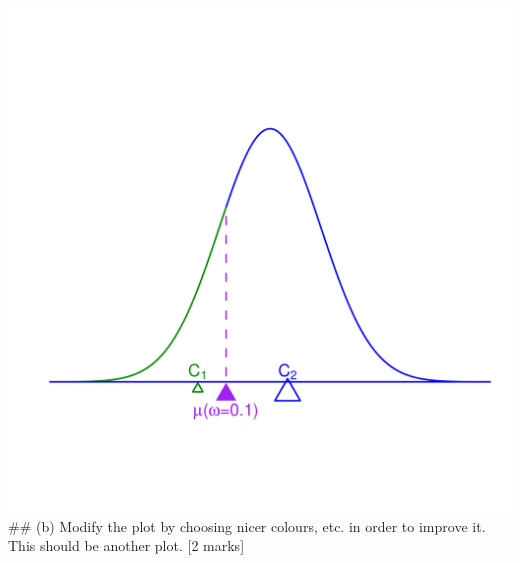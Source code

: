 \documentclass[]{article}
\begin{document}
\includegraphics{Assignment3_files/figure-latex/unnamed-chunk-2-1.pdf}
\#\# (b) Modify the plot by choosing nicer colours, etc. in order to
improve it. This should be another plot. {[}2 marks{]}
\end{document}
